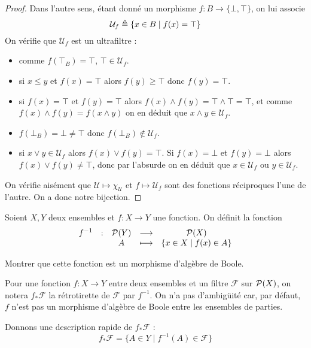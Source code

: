 \begin{proof}
  Dans l'autre sens, étant donné un morphisme $f : B \to \{\bot,\top\}$, on lui
  associe
  \[\mathcal U_f \triangleq \{x\in B \mid f(x) = \top\}\]
  On vérifie que $\mathcal U_f$ est un ultrafiltre :
  \begin{itemize}
  \item comme $f(\top_B) = \top$, $\top\in \mathcal U_f$.
  \item si $x\leq y$ et $f(x)=\top$ alors $f(y)\geq \top$ donc $f(y)=\top$.
  \item si $f(x) = \top$ et $f(y)=\top$ alors
    $f(x)\land f(y) = \top\land\top =\top$, et comme
    $f(x)\land f(y)=f(x\land y)$ on en déduit que $x\land y \in \mathcal U_f$.
  \item $f(\bot_B)=\bot\neq\top$ donc $f(\bot_B)\notin\mathcal U_f$.
  \item si $x\lor y \in \mathcal U_f$ alors $f(x)\lor f(y) = \top$. Si
    $f(x) = \bot$ et $f(y) = \bot$ alors $f(x)\lor f(y) \neq \top$, donc par
    l'absurde on en déduit que $x\in \mathcal U_f$ ou $y\in \mathcal U_f$.
  \end{itemize}

  On vérifie aisément que $\mathcal U \mapsto \chi_\mathcal U$ et
  $f\mapsto \mathcal U_f$ sont des fonctions réciproques l'une de l'autre.
  On a donc notre bijection.
\end{proof}

\begin{exercise}
  Soient $X,Y$ deux ensembles et $f : X \to Y$ une fonction. On définit la
  fonction
  \[\begin{array}{ccccc}
  f^{-1} & : & \mathcal{P}(Y) & \longrightarrow & \mathcal{P}(X)\\
  & & A & \longmapsto & \{x\in X \mid f(x) \in A\}
  \end{array}\]

  Montrer que cette fonction est un morphisme d'algèbre de Boole.
\end{exercise}

\begin{notation}
  Pour une fonction $f : X \to Y$ entre deux ensembles et un filtre $\mathcal F$
  sur $\mathcal{P}(X)$, on notera $f_*\mathcal F$ la rétrotirette de $\mathcal F$
  par $f^{-1}$. On n'a pas d'ambigüité car, par défaut, $f$ n'est pas un
  morphisme d'algèbre de Boole entre les ensembles de parties.

  Donnons une description rapide de $f_*\mathcal F$ :
  \[f_*\mathcal F = \{A \in Y \mid f^{-1}(A) \in \mathcal F\}\]
\end{notation}
